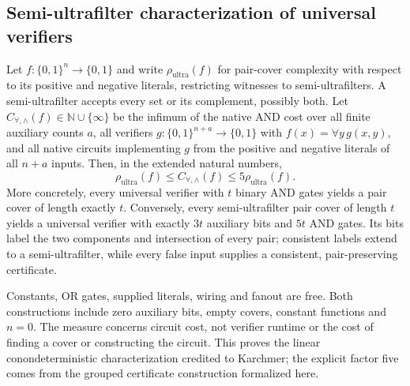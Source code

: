 \begin{result}
\subsection{Semi-ultrafilter characterization of universal verifiers}
Let $f:\{0,1\}^n\to\{0,1\}$ and write
$\rho_{\mathrm{ultra}}(f)$ for pair-cover complexity with respect to its
positive and negative literals, restricting witnesses to semi-ultrafilters.
A semi-ultrafilter accepts every set or its complement, possibly both.
Let $C_{\forall,\wedge}(f)\in\mathbb N\cup\{\infty\}$ be the infimum of the
native AND cost over all finite auxiliary counts $a$, all verifiers
$g:\{0,1\}^{n+a}\to\{0,1\}$ with $f(x)=\forall y\,g(x,y)$, and all native
circuits implementing $g$ from the positive and negative literals of all
$n+a$ inputs. Then, in the extended natural numbers,
\[
\rho_{\mathrm{ultra}}(f)\le C_{\forall,\wedge}(f)
\le 5\rho_{\mathrm{ultra}}(f).
\]
More concretely, every universal verifier with $t$ binary AND gates yields a
pair cover of length exactly $t$. Conversely, every semi-ultrafilter pair cover
of length $t$ yields a universal verifier with exactly $3t$ auxiliary bits and
$5t$ AND gates. Its bits label the two components and intersection of every
pair; consistent labels extend to a semi-ultrafilter, while every false input
supplies a consistent, pair-preserving certificate.

Constants, OR gates, supplied literals, wiring and fanout are free. Both
constructions include zero auxiliary bits, empty covers, constant functions
and $n=0$. The measure concerns circuit cost, not verifier runtime or the cost
of finding a cover or constructing the circuit. This proves the linear
conondeterministic characterization credited to Karchmer; the explicit factor
five comes from the grouped certificate construction formalized here.
\citep{CavalarOliveira2025}
\end{result}

